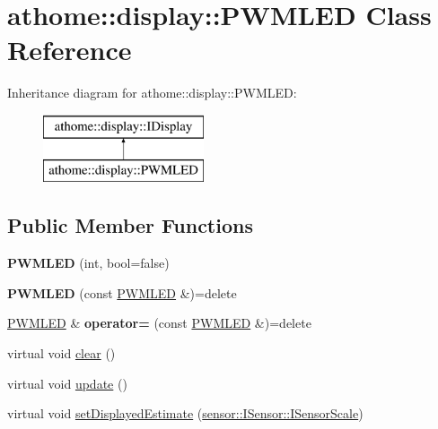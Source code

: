 \hypertarget{classathome_1_1display_1_1_p_w_m_l_e_d}{}\section{athome\+:\+:display\+:\+:P\+W\+M\+L\+ED Class Reference}
\label{classathome_1_1display_1_1_p_w_m_l_e_d}
Inheritance diagram for athome\+:\+:display\+:\+:P\+W\+M\+L\+ED\+:\begin{figure}[H]
\begin{center}
\leavevmode
\includegraphics[height=2.000000cm]{classathome_1_1display_1_1_p_w_m_l_e_d}
\end{center}
\end{figure}
\subsection*{Public Member Functions}
\begin{DoxyCompactItemize}
\item 
\mbox{\label{classathome_1_1display_1_1_p_w_m_l_e_d_a5c38a60e95d6c6b6c29bc6ba8d138690}} 
{\bfseries P\+W\+M\+L\+ED} (int, bool=false)
\item 
\mbox{\label{classathome_1_1display_1_1_p_w_m_l_e_d_a581dc9e092c193ef2fa19eb889a62c32}} 
{\bfseries P\+W\+M\+L\+ED} (const \mbox{\hyperlink{classathome_1_1display_1_1_p_w_m_l_e_d}{P\+W\+M\+L\+ED}} \&)=delete
\item 
\mbox{\label{classathome_1_1display_1_1_p_w_m_l_e_d_a66e47914fd9e6e836de8cc18732deadf}} 
\mbox{\hyperlink{classathome_1_1display_1_1_p_w_m_l_e_d}{P\+W\+M\+L\+ED}} \& {\bfseries operator=} (const \mbox{\hyperlink{classathome_1_1display_1_1_p_w_m_l_e_d}{P\+W\+M\+L\+ED}} \&)=delete
\item 
virtual void \mbox{\hyperlink{classathome_1_1display_1_1_p_w_m_l_e_d_ad13265bec1900a48d3d89aac9a532783}{clear}} ()
\item 
virtual void \mbox{\hyperlink{classathome_1_1display_1_1_p_w_m_l_e_d_a49a059d9bbd5bf08c0e057f0c957e736}{update}} ()
\item 
virtual void \mbox{\hyperlink{classathome_1_1display_1_1_p_w_m_l_e_d_a8cde32d9aa5b28dfbc79e2677bfce921}{set\+Displayed\+Estimate}} (\mbox{\hyperlink{classathome_1_1sensor_1_1_i_sensor_aa70bc27a4c17c86caf96cca776541ddf}{sensor\+::\+I\+Sensor\+::\+I\+Sensor\+Scale}})
\end{DoxyCompactItemize}


